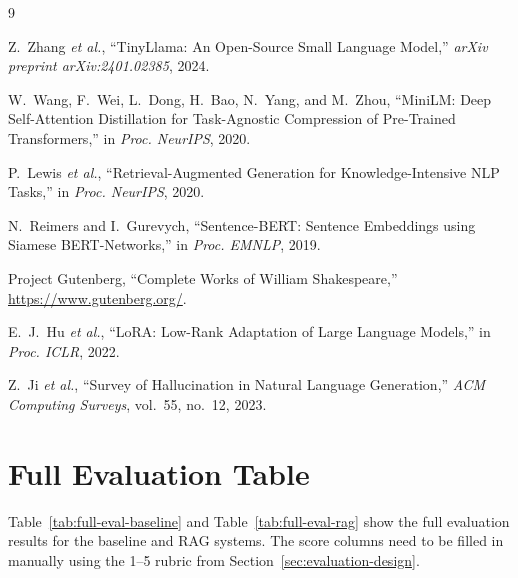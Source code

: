 \documentclass[10pt,conference]{IEEEtran}
\begin{document}
\begin{thebibliography}{9}

Z.~Zhang \textit{et al.}, ``TinyLlama: An Open-Source Small Language Model,'' \textit{arXiv preprint arXiv:2401.02385}, 2024.

W.~Wang, F.~Wei, L.~Dong, H.~Bao, N.~Yang, and M.~Zhou, ``MiniLM: Deep Self-Attention Distillation for Task-Agnostic Compression of Pre-Trained Transformers,'' in \textit{Proc. NeurIPS}, 2020.

P.~Lewis \textit{et al.}, ``Retrieval-Augmented Generation for Knowledge-Intensive NLP Tasks,'' in \textit{Proc. NeurIPS}, 2020.

N.~Reimers and I.~Gurevych, ``Sentence-BERT: Sentence Embeddings using Siamese BERT-Networks,'' in \textit{Proc. EMNLP}, 2019.

Project Gutenberg, ``Complete Works of William Shakespeare,'' \url{https://www.gutenberg.org/}.

E.~J.~Hu \textit{et al.}, ``LoRA: Low-Rank Adaptation of Large Language Models,'' in \textit{Proc. ICLR}, 2022.

Z.~Ji \textit{et al.}, ``Survey of Hallucination in Natural Language Generation,'' \textit{ACM Computing Surveys}, vol.~55, no.~12, 2023.

\end{thebibliography}

\appendices

\section{Full Evaluation Table}
\label{app:evaluation}

Table~\ref{tab:full-eval-baseline} and Table~\ref{tab:full-eval-rag} show the full evaluation results for the baseline and RAG systems. The score columns need to be filled in manually using the 1--5 rubric from Section~\ref{sec:evaluation-design}.
\end{document}
